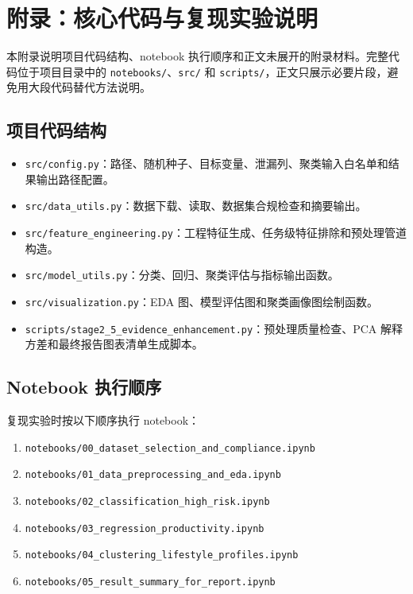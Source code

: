 \appendix
\section{附录：核心代码与复现实验说明}

本附录说明项目代码结构、notebook 执行顺序和正文未展开的附录材料。完整代码位于项目目录中的 \texttt{notebooks/}、\texttt{src/} 和 \texttt{scripts/}，正文只展示必要片段，避免用大段代码替代方法说明。

\subsection{项目代码结构}

\begin{itemize}
  \item \texttt{src/config.py}：路径、随机种子、目标变量、泄漏列、聚类输入白名单和结果输出路径配置。
  \item \texttt{src/data\_utils.py}：数据下载、读取、数据集合规检查和摘要输出。
  \item \texttt{src/feature\_engineering.py}：工程特征生成、任务级特征排除和预处理管道构造。
  \item \texttt{src/model\_utils.py}：分类、回归、聚类评估与指标输出函数。
  \item \texttt{src/visualization.py}：EDA 图、模型评估图和聚类画像图绘制函数。
  \item \texttt{scripts/stage2\_5\_evidence\_enhancement.py}：预处理质量检查、PCA 解释方差和最终报告图表清单生成脚本。
\end{itemize}

\subsection{Notebook 执行顺序}

复现实验时按以下顺序执行 notebook：

\begin{enumerate}
  \item \texttt{notebooks/00\_dataset\_selection\_and\_compliance.ipynb}
  \item \texttt{notebooks/01\_data\_preprocessing\_and\_eda.ipynb}
  \item \texttt{notebooks/02\_classification\_high\_risk.ipynb}
  \item \texttt{notebooks/03\_regression\_productivity.ipynb}
  \item \texttt{notebooks/04\_clustering\_lifestyle\_profiles.ipynb}
  \item \texttt{notebooks/05\_result\_summary\_for\_report.ipynb}
\end{enumerate}

